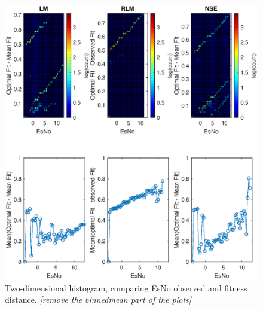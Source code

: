 \begin{figure}
\centering
\includegraphics[scale=0.9]{figures/c_sim_results/sim22_2dhist.eps}
\caption{Two-dimensional histogram, comparing EsNo observed and fitness distance. \textit{[remove the binnedmean part of the plots]}}
\label{fig:cSimBin2dHist}
\end{figure}

